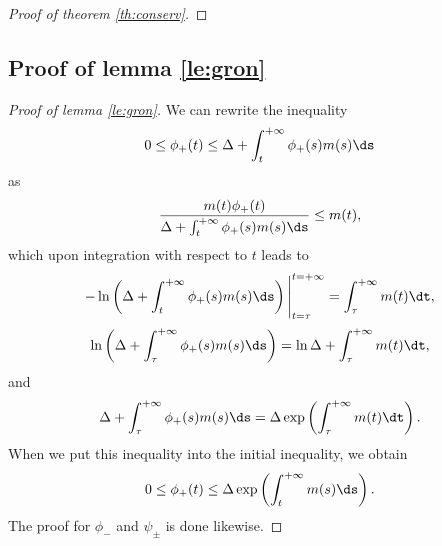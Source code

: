 \begin{subappendices}
\begin{proof}[Proof of theorem \ref{th:conserv}]
\end{proof}


	\subsection{Proof of lemma \ref{le:gron}} %
	\label{sec:proof_of_lemma_GRON}
	\begin{proof}[Proof of lemma \ref{le:gron}] 
		We can rewrite the inequality 
		\[0\le \phi_+(t)\le \Delta+\int_{t}^{+\infty}\phi_+(s)m(s)\ds \]
		as 
		\[\frac{m(t)\phi_+(t)}{\Delta+\int_{t}^{+\infty}\phi_+(s)m(s)\ds }\le m(t),\]
		which upon integration with respect to $t$ leads to
		\[-\ln\left(\Delta +\int_{t}^{+\infty}\phi_+(s)m(s)\ds \right)\Bigg|_{t=\tau}^{t=+\infty} = \int_{\tau}^{+\infty}m(t)\dt,\]
		\[\ln\left(\Delta +\int_{\tau}^{+\infty}\phi_+(s)m(s)\ds \right) = \ln\Delta+\int_{\tau}^{+\infty}m(t)\dt,\]and
		\[ \Delta +\int_{\tau}^{+\infty}\phi_+(s)m(s)\ds   =  \Delta\exp\left(\int_{\tau}^{+\infty}m(t)\dt\right).\]
		When we put this inequality into the initial inequality, we obtain
		\[0\le \phi_+(t)\le \Delta\exp\left(\int_{t}^{+\infty}m(s)\ds\right).\]
		The proof for $\phi_-$ and $\psi_\pm$ is done likewise.
	\end{proof}


\end{subappendices}